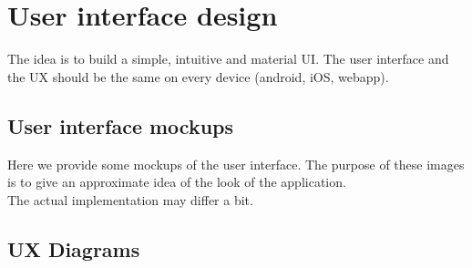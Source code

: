 \documentclass{article}
\begin{document}
\section{User interface design}
\label{sec:UI}
The idea is to build a simple, intuitive and material UI. The user interface and the UX should be the same on every device (android, iOS, webapp).
\subsection{User interface mockups}
Here we provide some mockups of the user interface. The purpose of these images is to give an approximate idea of the look of the application. 
\\ The actual implementation may differ a bit.
\subsection{UX Diagrams}
\end{document}
